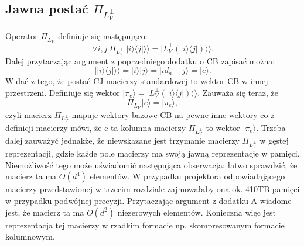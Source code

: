 \documentclass[10pt]{article} %
\newcommand{\Ket}[1]{|#1\rangle}
\newcommand{\Bra}[1]{\langle#1|}
\newcommand{\KKet}[1]{|#1\rangle\rangle}
\newcommand{\LPV}{{L^\perp_V}}
\begin{document}
\begin{appendices}
\section{Jawna postać $\Pi_\LPV$}
Operator $\Pi_\LPV$ definiuje się następująco:
\begin{equation}
\forall i,j~\Pi_\LPV \KKet{\Ket{i}\Bra{j}} = \KKet{\LPV(\Ket{i}\Bra{j})}.
\end{equation}
Dalej przytaczając argument z poprzedniego dodatku o CB zapisać można:
\begin{equation}
\KKet{\Ket{i}\Bra{j}} = \Ket{i}\Ket{j} = \Ket{i d_a + j} = \Ket{e}.
\end{equation} Widać z tego, że postać CJ macierzy standardowej to wektor CB w innej przestrzeni.
Definiuje się wektor $\Ket{\pi_{e}} = \KKet{\LPV(\Ket{i}\Bra{j})}$. Zauważa się teraz, że 
\begin{equation}
\Pi_\LPV \Ket{e} = \Ket{\pi_{e}},
\end{equation} czyli macierz $\Pi_\LPV$ mapuje wektory bazowe CB na pewne inne wektory co z definicji macierzy mówi, że e-ta kolumna macierzy $\Pi_\LPV$ to wektor $\Ket{\pi_{e}}$.
Trzeba dalej zauważyć jednakże, że niewskazane jest trzymanie macierzy $\Pi_\LPV$ w gęstej reprezentacji, gdzie każde pole macierzy ma swoją jawną reprezentacje w pamięci.
Niemożliwość tego może uświadomić następująca obserwacja: łatwo sprawdzić, że macierz ta ma $O(d^4)$ elementów. W przypadku projektora odpowiadającego macierzy przedstawionej w trzecim rozdziale zajmowałaby ona ok. 410TB pamięci w przypadku podwójnej precyzji.
Przytaczając argument z dodatku A wiadome jest, że macierz ta ma $O(d^2)$ niezerowych elementów. Konieczna więc jest reprezentacja tej macierzy w rzadkim formacie np. skompresowanym formacie kolumnowym.
\end{appendices}
\\
\end{document}
